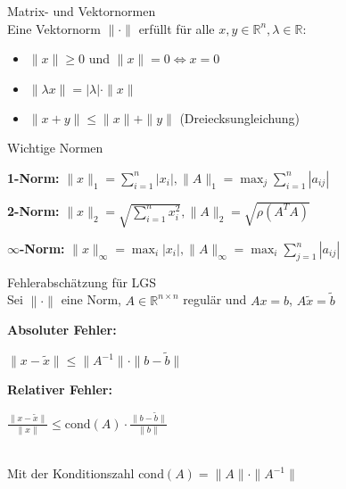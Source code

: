 \begin{definition}{Matrix- und Vektornormen}\\
Eine Vektornorm $\|\cdot\|$ erfüllt für alle $x,y \in \mathbb{R}^n, \lambda \in \mathbb{R}$:
\begin{itemize}
    \item $\|x\| \geq 0$ und $\|x\| = 0 \Leftrightarrow x = 0$
    \item $\|\lambda x\| = |\lambda| \cdot \|x\|$
    \item $\|x + y\| \leq \|x\| + \|y\|$ (Dreiecksungleichung)
\end{itemize}
\end{definition}

\begin{concept}{Wichtige Normen}

\textbf{1-Norm:}
        $\|x\|_1 = \sum_{i=1}^n |x_i|,
        \|A\|_1 = \max_j \sum_{i=1}^n |a_{ij}|$

\textbf{2-Norm:}
        $\|x\|_2 = \sqrt{\sum_{i=1}^n x_i^2}, 
        \|A\|_2 = \sqrt{\rho(A^TA)}$

$\infty$\textbf{-Norm:}
        $\|x\|_\infty = \max_i |x_i|, 
        \|A\|_\infty = \max_i \sum_{j=1}^n |a_{ij}|$
\end{concept}

\begin{theorem}{Fehlerabschätzung für LGS}\\
Sei $\|\cdot\|$ eine Norm, $A \in \mathbb{R}^{n\times n}$ regulär und $Ax = b$, $A\tilde{x} = \tilde{b}$
\vspace{1mm}\\
\begin{minipage}[t]{0.47\textwidth}
    \textbf{Absoluter Fehler:}
    \begin{center}
        $\|x - \tilde{x}\| \leq \|A^{-1}\| \cdot \|b - \tilde{b}\|$
    \end{center}
\end{minipage}
\hspace{2mm}
\begin{minipage}[t]{0.47\textwidth}
    \textbf{Relativer Fehler:}
    \begin{center}
        $\frac{\|x - \tilde{x}\|}{\|x\|} \leq \text{cond}(A) \cdot \frac{\|b - \tilde{b}\|}{\|b\|}$
    \end{center}
\end{minipage}
\vspace{1mm}\\
Mit der Konditionszahl $\text{cond}(A) = \|A\| \cdot \|A^{-1}\|$
\end{theorem}

